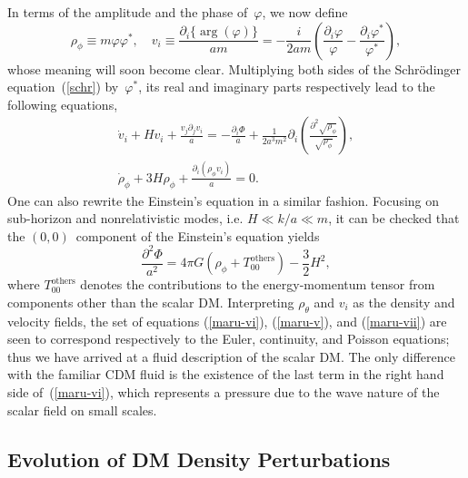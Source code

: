 \documentclass[11pt,nofootinbib]{article}
\numberwithin{equation}{section}
\begin{document}
In terms of the amplitude and the phase of~$\varphi$, we now define
\begin{equation}
 \rho_{\phi} \equiv
m \varphi \varphi^*,
  \quad
  v_i \equiv
  \frac{\partial_i \{ \arg (\varphi) \} }{a m }
  = 
- \frac{i}{ 2 a m}
  \left( \frac{\partial_i \varphi}{\varphi } - \frac{\partial_i
   \varphi^*}{\varphi^*}  \right),
\end{equation}
whose meaning will soon become clear.
Multiplying both sides of the Schr{\"o}dinger equation~(\ref{schr})
by~$\varphi^*$, its real and imaginary parts
respectively lead to the following equations, 
\begin{gather}
 \dot{v}_i + H v_i + \frac{v_j \partial_j v_i}{a}
  = -\frac{\partial_i \Phi}{a} +
  \frac{1}{2 a^3 m^2} \partial_i \left( \frac{\partial^2
				  \sqrt{\rho_{\phi}} }{\sqrt{\rho_{\phi} }} \right),
  \label{maru-vi}
 \\
 \dot{\rho}_{\phi} + 3 H \rho_{\phi} + \frac{\partial_i (\rho_{\phi} v_i)}{a} = 0.
\label{maru-v}
\end{gather}
One can also rewrite the Einstein's equation in a similar fashion.
Focusing on sub-horizon and nonrelativistic modes,
i.e. $ H \ll k/a \ll m$,
it can be checked that the $(0,0)$~component of the Einstein's equation yields
\begin{equation}
 \frac{\partial^2 \Phi }{a^2} =
  4 \pi G \left( \rho_{\phi} + T_{00}^{\mathrm{others}} \right)
  - \frac{3}{2} H^2,
  \label{maru-vii}
\end{equation}
where $T_{00}^{\mathrm{others}}$ denotes the contributions to the
energy-momentum tensor from components other than the scalar DM.
Interpreting $\rho_\theta$ and $v_i$ as the density and velocity
fields, the set of equations
(\ref{maru-vi}), (\ref{maru-v}), and (\ref{maru-vii}) are seen to
correspond respectively to the Euler, continuity, and Poisson equations;
thus we have arrived at a fluid description of the scalar DM.
The only difference with the familiar CDM fluid is the existence of the
last term in the right hand side of~(\ref{maru-vi}), 
which represents a pressure due to the wave nature of the scalar field
on small scales.




\subsection{Evolution of DM Density Perturbations}
\end{document}
